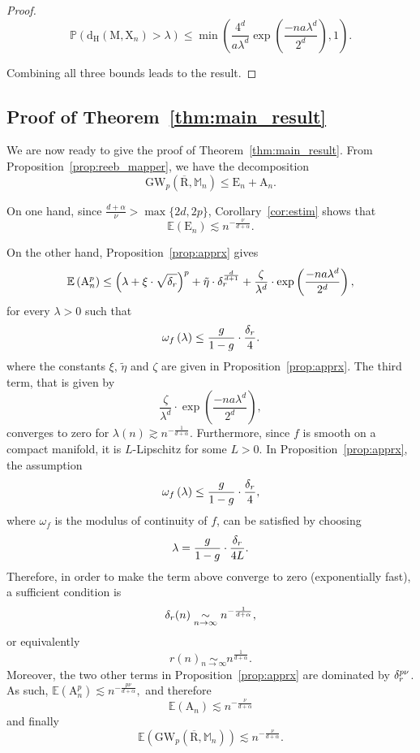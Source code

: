 \documentclass[pdflatex,sn-mathphys-ay]{sn-jnl}%
\newcommand{\reeb}{\mathrm{R}}
\newcommand{\man}{\mathrm{M}}
\newcommand{\sample}{\mathrm{X}}
\newcommand{\gromov}{\mathrm{GW}}
\newcommand{\appr}{{\mathrm {A}}}
\newcommand{\estim}{{\mathrm {E}}}
\newcommand{\haus}{{\mathrm {d_H}}}
\newcommand{\mapper}{{\mathbb{M}_n}}
\newcommand{\coverwidth}{\change{\delta_r}}
\newcommand{\change}[1]{\noindent #1}
\theoremstyle{thmstyleone}%
\begin{document}
\begin{proof}
$$\mathbb{P}\left(\haus(\man,\sample_n)>\lambda\right)\leq\min\left(\frac{4^d}{a\lambda^d}\exp\left(\frac{-na\lambda^d}{2^d}\right),1\right).$$

Combining all three bounds leads to the result.

\end{proof}

\subsection{\change{Proof of Theorem~\ref{thm:main_result}}}\label{subsec:proof_thm}
\change{We are now ready to give the proof of Theorem~\ref{thm:main_result}.} From Proposition~\ref{prop:reeb_mapper}, we have the decomposition
$$\gromov_p(\overline{\reeb},\mapper)\leq \estim_n+\appr_n.$$

On one hand, since $\frac{d+\alpha}{\nu}>\max\{2d,2p\}$, Corollary~\ref{cor:estim} shows that
$$\mathbb{E}\left(\estim_n\right)\lesssim n^{-\frac{\nu}{d+\alpha}}.$$

On the other hand, Proposition~\ref{prop:apprx} gives
$$\mathbb{E}\left(\appr_n^p\right)\leq \left(\lambda+\xi\cdot\sqrt{\coverwidth}\right)^p
    +\tilde{\eta}\cdot\coverwidth^{\frac{d}{d+1}}+\frac{\zeta}{\lambda^d}\cdot\exp\left(\frac{-na\lambda^d}{2^d}\right),$$
    for every $\lambda>0$ such that
$$\omega_f\left(\lambda\right)\leq\frac{g}{1-g}\cdot\frac{\coverwidth}{4}.$$
where the constants $\xi$, $\tilde{\eta}$ and $\zeta$ are given in Proposition~\ref{prop:apprx}. The third term, that is given by 
$$\frac{\zeta}{\lambda^d}\cdot\exp\left(\frac{-na\lambda^d}{2^d}\right),$$
converges to zero for   $\lambda(n) \gtrsim n^{-\frac{1}{d+\alpha}}$.
Furthermore, since $f$ is smooth on a compact manifold, it is $L$-Lipschitz for some $L>0$. 
In Proposition~\ref{prop:apprx}, the assumption
$$\omega_f\left(\lambda\right)\leq\frac{g}{1-g}\cdot\frac{\coverwidth}{4},$$
where $\omega_f$ is the modulus of continuity of $f$, can be satisfied by choosing
$$\lambda=\frac{g}{1-g}\cdot\frac{\coverwidth}{4L}.$$
Therefore, in order to make the term above converge to zero (exponentially fast), a sufficient condition is
$$\coverwidth(n)\underset{n\rightarrow\infty}{\sim} n^{-\frac{1}{d+\alpha}},$$
or equivalently
$$r(n)\underset{n\rightarrow\infty}{\sim} n^{\frac{1}{d+\alpha}}.$$
Moreover, the two other terms in Proposition~\ref{prop:apprx} are dominated by $\coverwidth^{p\nu}$.
As such, 
$\mathbb{E}\left(\appr_n^p\right) \lesssim n^{-\frac{p\nu}{d+\alpha}},$
and therefore
$$\mathbb{E}\left(\appr_n\right)\lesssim n^{-\frac{\nu}{d+\alpha}}$$
and finally
$$\mathbb{E}\left(\gromov_p(\overline{\reeb},\mapper)\right)\lesssim n^{-\frac{\nu}{d+\alpha}}.$$
\end{document}
